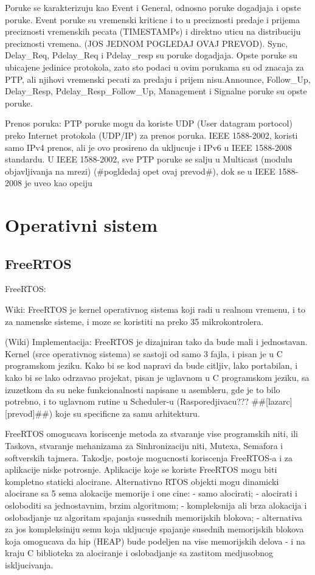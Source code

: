 \documentclass[a4paper,12pt, master]{etf}
\begin{document}
	Poruke se karakterizuju kao Event i General, odnosno poruke dogadjaja i opste poruke. Event
	poruke su vremenski kriticne i to u preciznosti predaje i prijema preciznosti vremenskih pecata
	(TIMESTAMPs) i direktno uticu na distribuciju preciznosti vremena. (JOS JEDNOM POGLEDAJ OVAJ
	PREVOD). Sync, Delay\_Req, Pdelay\_Req i Pdelay\_resp su poruke dogadjaja. Opste poruke su
	ubicajene jedinice protokola, zato sto podaci u ovim porukama su od znacaja za PTP, ali njihovi
	vremenski pecati za predaju i prijem nisu.Announce, Follow\_Up, Delay\_Resp,
	Pdelay\_Resp\_Follow\_Up, Management i Signalne poruke su opste poruke.

	Prenos poruka:
	PTP poruke mogu da koriste UDP (User datagram portocol) preko Internet protokola (UDP/IP) za
	prenos poruka. IEEE 1588-2002, koristi samo IPv4 prenos, ali je ovo prosireno da ukljucuje i
	IPv6 u IEEE 1588-2008 standardu. U IEEE 1588-2002, sve PTP poruke se salju u Multicast (modulu
	objavljivanja na mrezi) (\#pogldedaj opet ovaj prevod\#), dok se u IEEE 1588-2008 je uveo kao
	opciju

	\newpage

	\chapter{Operativni sistem}

	\section{FreeRTOS}
	FreeRTOS:

	Wiki:
	FreeRTOS je kernel operativnog sistema koji radi u realnom vremenu, i to za namenske sisteme, i
	moze se koristiti na preko 35 mikrokontrolera.

	(Wiki) Implementacija:
	FreeRTOS je dizajniran tako da bude mali i jednostavan. Kernel (srce operativnog sistema) se
	sastoji od samo 3 fajla, i pisan je u C programskom jeziku. Kako bi se kod napravi da bude
	citljiv, lako portabilan, i kako bi se lako odrzavao projekat, pisan je uglavnom u C
	programskom jeziku, sa izuzetkom da su neke funkcionalnosti napisane u asembleru, gde je to
	bilo potrebno, i to uglavnom rutine u Scheduler-u (Rasporedjivacu??? \#\#[lazarc] [prevod]\#\#)
	koje su specificne za samu arhitekturu.

	FreeRTOS omogucava koriscenje metoda za stvaranje vise programskih niti, ili Taskova, stvaranje
	mehanizama za Sinhronizaciju niti, Mutexa, Semafora i softverskih tajmera. Takodje, postoje
	mogucnosti koriscenja FreeRTOS-a i za aplikacije niske potrosnje. Aplikacije koje se koriste
	FreeRTOS mogu biti kompletno staticki alocirane. Alternativno RTOS objekti mogu dinamicki
	alocirane sa 5 sema alokacije memorije i one cine:
	- samo alocirati;
	- alocirati i osloboditi sa jednostavnim, brzim algoritmom;
	- kompleksnija ali brza alokacija i oslobadjanje uz algoritam spajanja sussednih memorijskih
	blokova;
	- alternativa za jos kompleksiniju semu koja ukljucuje spajanje susednih memorijskih blokova
	koja omogucava da hip (HEAP) bude podeljen na vise memorijskih delova
	- i na kraju C biblioteka za alociranje i oslobadjanje sa zastitom medjusobnog iskljucivanja.
\end{document}
